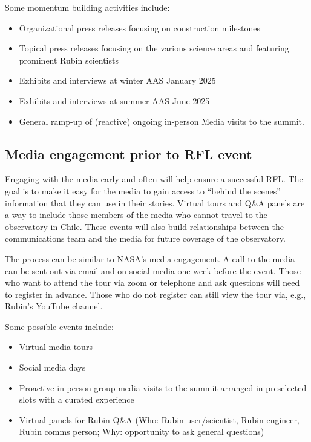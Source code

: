 Some momentum building activities include:
\begin{itemize} 
\item Organizational press releases focusing on construction milestones
\item Topical press releases focusing on the various science areas and featuring prominent Rubin scientists
\item Exhibits and interviews at winter AAS January 2025
\item Exhibits and interviews at summer AAS June 2025
\item General ramp-up of (reactive) ongoing in-person Media visits to the summit.
\end{itemize}


\subsection{Media engagement prior to RFL event}

Engaging with the media early and often will help ensure a successful RFL. The goal is to make it easy for the media
to gain access to ``behind the scenes'' information that they can use in their stories. Virtual tours and Q\&A panels
are a way to include those members of the media who cannot travel to the observatory in Chile. These events will
also build relationships between the communications team and the media for future coverage of the observatory. 

The process can be similar to NASA’s media engagement. A call to the media can be sent out via email and on social
media one week before the event. Those who want to attend the tour via zoom or telephone and ask questions will
need to register in advance. Those who do not register can still view the tour via, e.g., Rubin's YouTube channel. 

Some possible events include:
\begin{itemize} 
\item Virtual media tours
\item Social media days
\item Proactive in-person group media visits to the summit arranged in preselected slots with a curated experience
\item Virtual panels for Rubin Q\&A (Who: Rubin user/scientist, Rubin engineer, Rubin comms person; Why: opportunity
               to ask general questions)
\end{itemize} 



